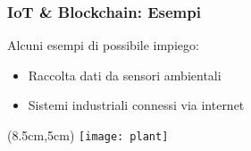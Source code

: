 \begin{frame}
 \frametitle{IoT \& Blockchain: Esempi}

 Alcuni esempi di possibile impiego:
 \begin{itemize}
  \item<1-> Raccolta dati da sensori ambientali
  \item<2-> Sistemi industriali connessi via internet
 \end{itemize}
 
 
 \begin{textblock*}{5cm}(8.5cm,5cm)
  \texttt{[image: plant]}
 \end{textblock*}

\end{frame}

%
%
%

